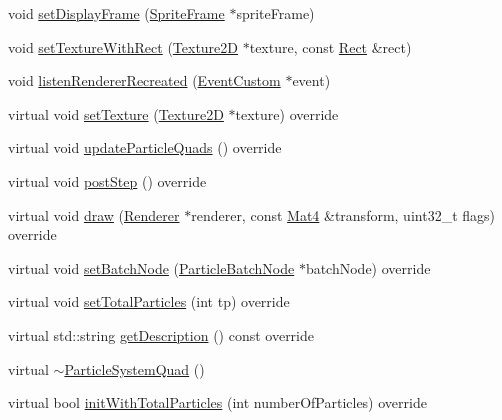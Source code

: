 \begin{DoxyCompactItemize}
\item 
void \hyperlink{classParticleSystemQuad_a8a9c1216cee41ca83f508da8a65529d1}{set\+Display\+Frame} (\hyperlink{classSpriteFrame}{Sprite\+Frame} $\ast$sprite\+Frame)
\item 
void \hyperlink{classParticleSystemQuad_a496325dbe905d3359382c149b04d8f9b}{set\+Texture\+With\+Rect} (\hyperlink{classTexture2D}{Texture2D} $\ast$texture, const \hyperlink{classRect}{Rect} \&rect)
\item 
void \hyperlink{classParticleSystemQuad_aa133fa205fb39f435a9b46545612fd42}{listen\+Renderer\+Recreated} (\hyperlink{classEventCustom}{Event\+Custom} $\ast$event)
\item 
virtual void \hyperlink{classParticleSystemQuad_a40208d3483849c4855d4132232b4bb8c}{set\+Texture} (\hyperlink{classTexture2D}{Texture2D} $\ast$texture) override
\item 
virtual void \hyperlink{classParticleSystemQuad_aaa4944b341aea804011cc17160a59068}{update\+Particle\+Quads} () override
\item 
virtual void \hyperlink{classParticleSystemQuad_a8c357c48c5ade4091b73245068c8cbe3}{post\+Step} () override
\item 
virtual void \hyperlink{classParticleSystemQuad_ab2e534c8bfc790921b3519647ab91073}{draw} (\hyperlink{classRenderer}{Renderer} $\ast$renderer, const \hyperlink{classMat4}{Mat4} \&transform, uint32\+\_\+t flags) override
\item 
virtual void \hyperlink{classParticleSystemQuad_aebafe7b796960463ca8c16358c8d819f}{set\+Batch\+Node} (\hyperlink{classParticleBatchNode}{Particle\+Batch\+Node} $\ast$batch\+Node) override
\item 
virtual void \hyperlink{classParticleSystemQuad_a8798b3c44a7db32d7ab5b76e245edd27}{set\+Total\+Particles} (int tp) override
\item 
virtual std\+::string \hyperlink{classParticleSystemQuad_a35f7879ed4a7c15a151b83d49f7c2502}{get\+Description} () const override
\item 
virtual \hyperlink{classParticleSystemQuad_af8994136a3df715abb8e9cc2cbb6d6bf}{$\sim$\+Particle\+System\+Quad} ()
\item 
virtual bool \hyperlink{classParticleSystemQuad_a5682dcfe9ae99cb23e3a95582d9abf4d}{init\+With\+Total\+Particles} (int number\+Of\+Particles) override
\end{DoxyCompactItemize}
